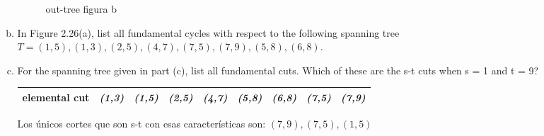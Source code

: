 \documentclass{report}
\begin{document}
\begin{enumerate}[2.1]
\begin{enumerate}[(a)]
\begin{figure}[ht]
\begin{minipage}[b]{0.4\linewidth}
                    \caption{out-tree figura b}
                    \end{minipage}
                \end{figure}
        \item In Figure 2.26(a), list all fundamental cycles with respect to the following spanning
        tree $T = {(1, 5), (1, 3), (2, 5), (4, 7), (7, 5), (7, 9), (5, 8), (6, 8)}$.
        \begin{table}[h!t] %
            \centering
            \end{table}
        \newpage
        \item For the spanning tree given in part (c), list all fundamental cuts. Which of these
        are the s-t cuts when s = 1 and t = 9?
        \begin{table}[ht]
            \centering
            \begin{tabular}{|l|l|l|l|l|l|l|l|l|}
            \hline
            \textbf{elemental cut} & \textit{(1,3)} & \textit{(1,5)} & \textit{(2,5)} & \textit{(4,7)} & \textit{(5,8)} & \textit{(6,8)} & \textit{(7,5)} & \textit{(7,9)} \\ \hline
            \end{tabular}
            \end{table} \newline
        Los únicos cortes que son  s-t con esas características son: $(7,9), (7,5), (1,5)$
    \end{enumerate} %
   

\end{enumerate}
\end{document}
